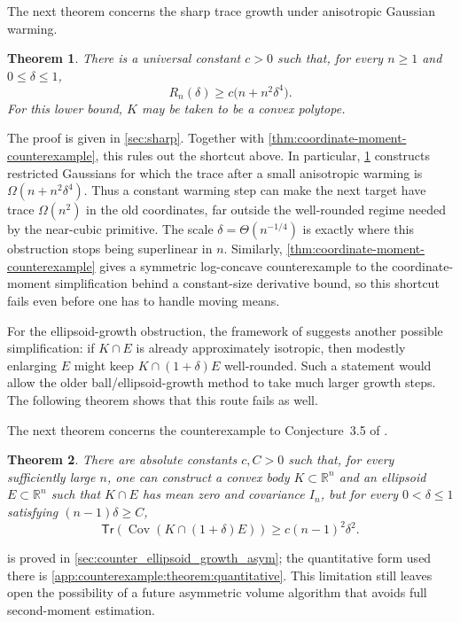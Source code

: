 \documentclass[11pt]{article}
\numberwithin{equation}{section}
\newtheorem{theorem}{Theorem}
\theoremstyle{definition}
\newcommand{\R}{\mathbb{R}}
\newcommand{\Tr}[1]{\mathsf{Tr}\left(#1\right)}
\begin{document}
The next theorem concerns the sharp trace growth under anisotropic Gaussian
warming.

\begin{theorem}
\label{thm:sharp-trace-lower}
There is a universal constant $c>0$ such that, for every
$n\geq1$ and
$0\leq\delta\leq1$,
\[
  R_n(\delta)\geq c\bigl(n+n^2\delta^4\bigr).
\]
For this lower bound, $K$ may be taken to be a convex polytope.
\end{theorem}

The proof is given in \cref{sec:sharp}.
Together with \cref{thm:coordinate-moment-counterexample}, this rules out the
shortcut above.
In particular, \cref{thm:sharp-trace-lower} constructs restricted Gaussians for
which the trace after a small anisotropic warming is $\Omega(n+n^2\delta^4)$.
Thus a constant warming step can make the next target have trace $\Omega(n^2)$
in the old coordinates, far outside the well-rounded regime needed by the
near-cubic primitive.
The scale $\delta=\Theta(n^{-1/4})$ is exactly where this obstruction stops
being superlinear in
$n$.
Similarly, \cref{thm:coordinate-moment-counterexample} gives a symmetric
log-concave counterexample to the coordinate-moment simplification behind a
constant-size derivative bound, so this shortcut fails even before one has to
handle moving means.

For the ellipsoid-growth obstruction, the framework of \cite{JLLV26:journal}
suggests another possible simplification: if $K\cap E$ is already approximately
isotropic, then modestly enlarging
$E$ might keep
$K\cap(1+\delta)E$ well-rounded.
Such a statement would allow the older ball/ellipsoid-growth method to take much
larger growth steps.
The following theorem shows that this route fails as well.

The next theorem concerns the counterexample to Conjecture~3.5 of
\cite{JLLV26:journal}.

\begin{theorem}
\label{thm:overview-counterexample-conj35}
There are absolute constants $c,C>0$ such that, for every sufficiently large
$n$, one can construct a convex body
$K\subset\R^n$ and an ellipsoid
$E\subset\R^n$ such that
$K\cap E$ has mean zero and covariance
$I_n$, but for every
$0<\delta\le1$ satisfying
$(n-1)\delta\ge C$,
\[
\Tr{\operatorname{Cov}(K\cap(1+\delta)E)}
\ge c(n-1)^2\delta^2.
\]
\end{theorem}

 is proved in
\cref{sec:counter_ellipsoid_growth_asym}; the quantitative form used there is
\cref{app:counterexample:theorem:quantitative}.
This limitation still leaves open the possibility of a future asymmetric volume
algorithm that avoids full second-moment estimation.
\end{document}
